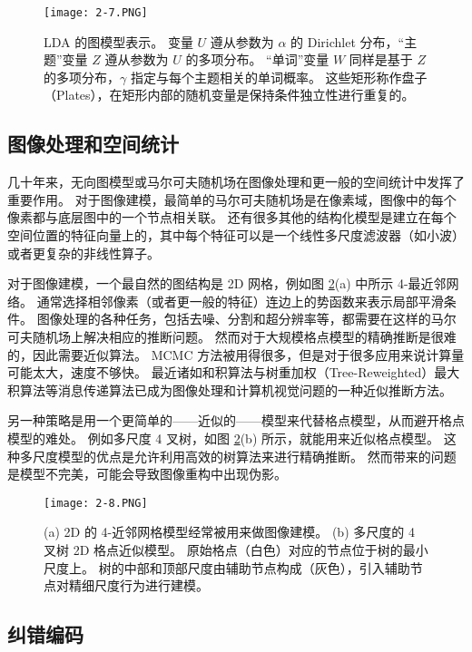 \begin{figure}[htbp]
    \centering
    \texttt{[image: 2-7.PNG]}
    \caption{
        LDA 的图模型表示。
        变量 $U$ 遵从参数为 $\alpha$ 的 Dirichlet 分布，“主题”变量 $Z$ 遵从参数为 $U$ 的多项分布。
        “单词”变量 $W$ 同样是基于 $Z$ 的多项分布，$\gamma$ 指定与每个主题相关的单词概率。
        这些矩形称作盘子（Plates），在矩形内部的随机变量是保持条件独立性进行重复的。
    }\label{fig:2-7}
\end{figure}

\subsection{图像处理和空间统计}

几十年来，无向图模型或马尔可夫随机场在图像处理和更一般的空间统计中发挥了重要作用。
对于图像建模，最简单的马尔可夫随机场是在像素域，图像中的每个像素都与底层图中的一个节点相关联。
还有很多其他的结构化模型是建立在每个空间位置的特征向量上的，其中每个特征可以是一个线性多尺度滤波器（如小波）或者更复杂的非线性算子。

对于图像建模，一个最自然的图结构是 2D 网格，例如图 \ref{fig:2-8}(a) 中所示 4-最近邻网络。
通常选择相邻像素（或者更一般的特征）连边上的势函数来表示局部平滑条件。
图像处理的各种任务，包括去噪、分割和超分辨率等，都需要在这样的马尔可夫随机场上解决相应的推断问题。
然而对于大规模格点模型的精确推断是很难的，因此需要近似算法。
MCMC 方法被用得很多，但是对于很多应用来说计算量可能太大，速度不够快。
最近诸如和积算法与树重加权（Tree-Reweighted）最大积算法等消息传递算法已成为图像处理和计算机视觉问题的一种近似推断方法。

另一种策略是用一个更简单的——近似的——模型来代替格点模型，从而避开格点模型的难处。
例如多尺度 4 叉树，如图 \ref{fig:2-8}(b) 所示，就能用来近似格点模型。
这种多尺度模型的优点是允许利用高效的树算法来进行精确推断。
然而带来的问题是模型不完美，可能会导致图像重构中出现伪影。

\begin{figure}[htbp]
    \centering
    \texttt{[image: 2-8.PNG]}
    \caption{
        (a) 2D 的 4-近邻网格模型经常被用来做图像建模。
        (b) 多尺度的 4 叉树 2D 格点近似模型。
        原始格点（白色）对应的节点位于树的最小尺度上。
        树的中部和顶部尺度由辅助节点构成（灰色），引入辅助节点对精细尺度行为进行建模。
    }\label{fig:2-8}
\end{figure}

\subsection{纠错编码}

